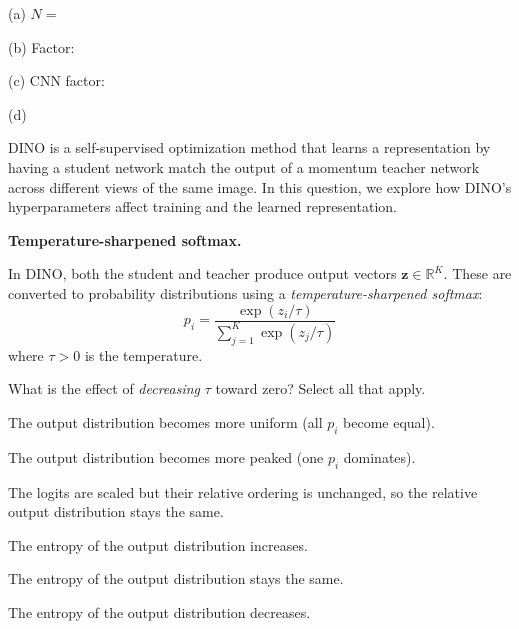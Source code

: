 \documentclass{csci1430}
\begin{document}
\begin{answer}[height=20]
(a) $N =$

\vspace{1em}
(b) Factor:

\vspace{1em}
(c) CNN factor:

\vspace{1em}
(d)
\end{answer}


\pagebreak

\begin{question}[points=12,drawbox=false]
DINO is a self-supervised optimization method that learns a representation by having a student network match the output of a momentum teacher network across different views of the same image. In this question, we explore how DINO's hyperparameters affect training and the learned representation.
\end{question}

\begin{subquestion}[points=3]
\textbf{Temperature-sharpened softmax.}

In DINO, both the student and teacher produce output vectors $\mathbf{z} \in \mathbb{R}^K$. These are converted to probability distributions using a \emph{temperature-sharpened softmax}:
\[
p_i = \frac{\exp(z_i / \tau)}{\sum_{j=1}^{K} \exp(z_j / \tau)}
\]
where $\tau > 0$ is the temperature. 

What is the effect of \emph{decreasing} $\tau$ toward zero? Select all that apply.
\end{subquestion}

\begin{answerlist}
    \item The output distribution becomes more uniform (all $p_i$ become equal).
    \item The output distribution becomes more peaked (one $p_i$ dominates).
    \item The logits are scaled but their relative ordering is unchanged, so the relative output distribution stays the same.
    \item The entropy of the output distribution increases.
    \item The entropy of the output distribution stays the same.
    \item The entropy of the output distribution decreases.

\end{answerlist}
\end{document}
